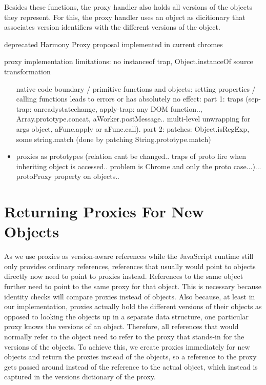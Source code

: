 Besides these functions, the proxy handler also holds all versions of the objects they represent.
For this, the proxy handler uses an object as dicitionary that associates version identifiers with the different versions of the object.



deprecated Harmony Proxy proposal implemented in current chromes

proxy implementation limitations:
no instanceof trap, Object.instanceOf source transformation

\begin{itemize}
    \item [native code] boundary / primitive functions and objects: setting properties / calling functions leads to errors or has absolutely no effect: part 1: traps (sep-trap: onreadystatechange, apply-trap: any DOM function.., Array.prototype.concat, aWorker.postMessage.. multi-level unwrapping for args object, aFunc.apply or aFunc.call).
part 2: patches: Object.isRegExp, some string.match (done by patching String.prototype.match)
    \item proxies as prototypes (relation cant be changed.. traps of proto fire when inheriting object is accessed.. problem is Chrome and only the proto case...)... protoProxy property on objects..
\end{itemize}










\section{Returning Proxies For New Objects}

As we use proxies as version-aware references while the JavaScript runtime still only provides ordinary references, references that usually would point to objects directly now need to point to proxies instead. 
References to the same object further need to point to the same proxy for that object.
This is necessary because identity checks will compare proxies instead of objects.
Also because, at least in our implementation, proxies actually hold the different versions of their objects as opposed to looking the objects up in a separate data structure, one particular proxy knows the versions of an object.
Therefore, all references that would normally refer to the object need to refer to the proxy that stands-in for the versions of the objects.
To achieve this, we create proxies immediately for new objects and return the proxies instead of the objects, so a reference to the proxy gets passed around instead of the reference to the actual object, which instead is captured in the versions dictionary of the proxy.

